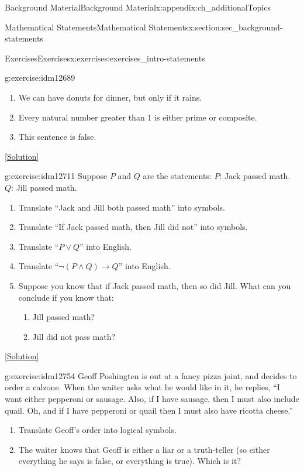 \documentclass[oneside,10pt,]{book}
\numberwithin{equation}{chapter}
\def\imp{\rightarrow}
\begin{document}
\begin{appendixptx}{Background Material}{}{Background Material}{}{}{x:appendix:ch_additionalTopics}
\begin{sectionptx}{Mathematical Statements}{}{Mathematical Statements}{}{}{x:section:sec_background-statements}
\begin{exercises-subsection}{Exercises}{}{Exercises}{}{}{x:exercises:exercises_intro-statements}
\begin{divisionexercise}{1}{}{}{g:exercise:idm12689}
\begin{enumerate}[label=(\alph*)]
\item{}We can have donuts for dinner, but only if it rains.%
\item{}Every natural number greater than 1 is either prime or composite.%
\item{}This sentence is false.%
\end{enumerate}
%
\space\hspace*{0pt}\hfill{\tiny\hyperlink{g:solution:idm12699-main}{[Solution]}}\end{divisionexercise}%
\begin{divisionexercise}{2}{}{}{g:exercise:idm12711}%
Suppose \(P\) and \(Q\) are the statements: \(P\): Jack passed math. \(Q\): Jill passed math.%
%
\begin{enumerate}[label=(\alph*)]
\item{}Translate ``Jack and Jill both passed math'' into symbols.%
\item{}Translate ``If Jack passed math, then Jill did not'' into symbols.%
\item{}Translate ``\(P \vee Q\)'' into English.%
\item{}Translate ``\(\neg(P \wedge Q) \imp Q\)'' into English.%
\item{}Suppose you know that if Jack passed math, then so did Jill.  What can you conclude if you know that:%
\begin{enumerate}[label=\roman*.]
\item{}Jill passed math?%
\item{}Jill did not pass math?%
\end{enumerate}
%
\end{enumerate}
\space\hspace*{0pt}\hfill{\tiny\hyperlink{g:solution:idm12738-main}{[Solution]}}\end{divisionexercise}%
\begin{divisionexercise}{3}{}{}{g:exercise:idm12754}%
Geoff Poshingten is out at a fancy pizza joint, and decides to order a calzone. When the waiter asks what he would like in it, he replies, ``I want either pepperoni or sausage. Also, if I have sausage, then I must also include quail. Oh, and if I have pepperoni or quail then I must also have ricotta cheese.''%
%
\begin{enumerate}[label=(\alph*)]
\item{}Translate Geoff's order into logical symbols.%
\item{}The waiter knows that Geoff is either a liar or a truth-teller (so either everything he says is false, or everything is true).  Which is it?%

\end{enumerate}
\end{divisionexercise}
\end{exercises-subsection}
\end{sectionptx}
\end{appendixptx}
\end{document}
